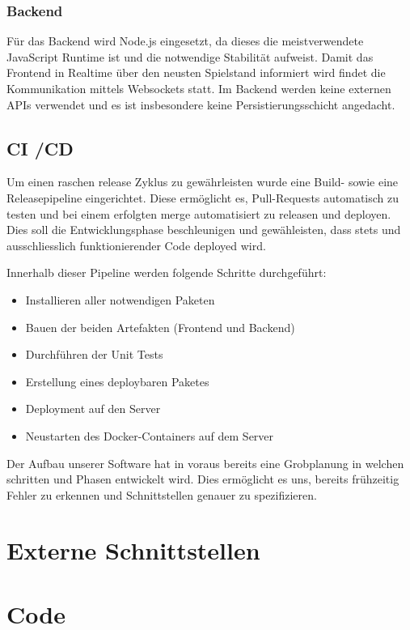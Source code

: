 \documentclass[a4paper, 11pt]{scrartcl}
\let\oldsection\section
\renewcommand\section{\clearpage\oldsection}
\begin{document}
\subsubsection{Backend}
Für das Backend wird Node.js eingesetzt, da dieses die meistverwendete JavaScript Runtime ist und die notwendige Stabilität aufweist.
Damit das Frontend in Realtime über den neusten Spielstand informiert wird findet die Kommunikation mittels Websockets statt.
Im Backend werden keine externen APIs verwendet und es ist insbesondere keine Persistierungsschicht angedacht.

\subsection{CI /CD}
Um einen raschen release Zyklus zu gewährleisten wurde eine Build- sowie eine Releasepipeline eingerichtet.
Diese ermöglicht es, Pull-Requests automatisch zu testen und bei einem erfolgten merge automatisiert zu releasen und deployen.
Dies soll die Entwicklungsphase beschleunigen und gewähleisten, dass stets und ausschliesslich funktionierender Code deployed wird.

Innerhalb dieser Pipeline werden folgende Schritte durchgeführt:
\begin{itemize}
  \item Installieren aller notwendigen Paketen
  \item Bauen der beiden Artefakten (Frontend und Backend)
  \item Durchführen der Unit Tests
  \item Erstellung eines deploybaren Paketes
  \item Deployment auf den Server
  \item Neustarten des Docker-Containers auf dem Server
\end{itemize}

Der Aufbau unserer Software hat in voraus bereits eine Grobplanung in welchen schritten und Phasen entwickelt wird.
Dies ermöglicht es uns, bereits frühzeitig Fehler zu erkennen und Schnittstellen genauer zu spezifizieren.

\section{Externe Schnittstellen}

\section{Code}
\end{document}
